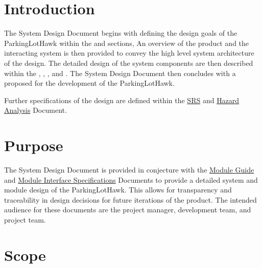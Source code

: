 \documentclass[12pt, titlepage]{article}
\begin{document}
\newpage

\tableofcontents

\newpage

\listoftables

\listoffigures

\newpage


\section{Introduction}

The System Design Document begins with defining the design goals of the ParkingLotHawk within the  and  sections, An overview of the product and the interacting system is then provided to convey the high level system architecture of the design. The detailed design of the system components are then described within the , , , and . The System Design Document then concludes with a proposed  for the development of the ParkingLotHawk.

Further specifications of the design are defined within the  \href{https://github.com/icecap360/DroneCapstone/blob/master/docs/SRS/SRS.pdf}{SRS} and \href{https://github.com/icecap360/DroneCapstone/blob/master/docs/HazardAnalysis/HazardAnalysis.pdf}{Hazard Analysis} Document.

\section{Purpose}
\label{sec:purpose}

The System Design Document is provided in conjecture with the \href{https://github.com/icecap360/DroneCapstone/blob/master/docs/Design/SoftArchitecture/MG.pdf}{Module Guide} and \href{https://github.com/icecap360/DroneCapstone/blob/master/docs/Design/SoftDetailedDes/MIS.pdf}{Module Interface Specifications} Documents to provide a detailed system and module design of the ParkingLotHawk. This allows for transparency and traceability in design decisions for future iterations of the product. The intended audience for these documents are the project manager, development team, and project team.

\section{Scope}
\label{sec:scope}
\end{document}
